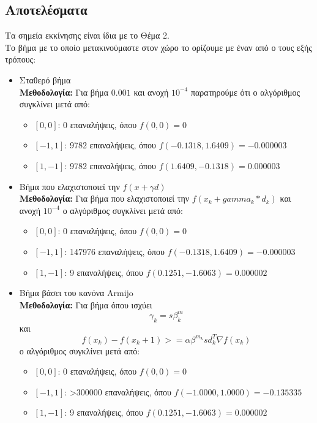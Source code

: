 \documentclass{report}
\begin{document}
\subsection{Αποτελέσματα}
Τα σημεία εκκίνησης είναι ίδια με το Θέμα 2.\\
Το βήμα με το οποίο μετακινούμαστε στον χώρο το ορίζουμε με έναν από ο τους εξής τρόπους:
\begin{itemize}
    \item Σταθερό βήμα\\
    \textbf{Μεθοδολογία:} Για βήμα $0.001$ και ανοχή $10^{-4}$ παρατηρούμε ότι ο αλγόριθμος συγκλίνει
    μετά από:
    \begin{itemize}
        \item \([0,0]\): 0 επαναλήψεις, όπου $f(0,0) = 0$
        \item \([-1,1]\): 9782 επαναλήψεις, όπου $f(-0.1318, 1.6409) = -0.000003$
        \item \([1,-1]\): 9782 επαναλήψεις, όπου $f(1.6409, -0.1318) = 0.000003$
    \end{itemize}
    
    \item Βήμα που ελαχιστοποιεί την $f(x + γd)$\\
    \textbf{Μεθοδολογία:} Για βήμα που ελαχιστοποιεί την $f(x_k + gamma_k * d_k)$ και ανοχή $10^{-4}$
    ο αλγόριθμος συγκλίνει μετά από:
    \begin{itemize}
        \item \([0,0]\): 0 επαναλήψεις, όπου $f(0,0) = 0$
        \item \([-1,1]\): 147976 επαναλήψεις, όπου $f(-0.1318, 1.6409) = -0.000003$
        \item \([1,-1]\): 9 επαναλήψεις, όπου $f(0.1251, -1.6063) = 0.000002$
    \end{itemize}
    \item Βήμα βάσει του κανόνα Armijo\\
    \textbf{Μεθοδολογία:} Για βήμα όπου ισχύει\\
    $$γ_k = s \beta^m_k$$ και 
    $$f(x_k)-f(x_k+1)>=\alpha \beta^{m_k} s d_k^T \nabla f(x_k)$$
    ο αλγόριθμος συγκλίνει μετά από:
    \begin{itemize}
        \item \([0,0]\): 0 επαναλήψεις, όπου $f(0,0) = 0$
        \item \([-1,1]\): >300000 επαναλήψεις, όπου $f(-1.0000, 1.0000) = -0.135335$
        \item \([1,-1]\): 9 επαναλήψεις, όπου $f(0.1251, -1.6063) = 0.000002$
    \end{itemize}
\end{itemize}
\end{document}
